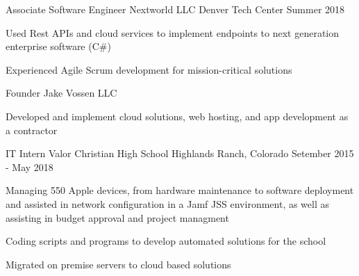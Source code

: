 

\begin{cventries}

  \cventry
    {Associate Software Engineer} %
    {Nextworld LLC} %
    {Denver Tech Center} %
    {Summer 2018} %
    {
      \begin{cvitems} %
        \item {Used Rest APIs and cloud services to implement
            endpoints to next generation enterprise software (C\#)}
        \item {Experienced Agile Scrum development for mission-critical solutions}
      \end{cvitems}
    }

  \cventry
    {Founder}
    {Jake Vossen LLC} %
    {} %
    { }
    {
      \begin{cvitems} %
        \item {Developed and implement cloud solutions, web hosting,
            and app development as a contractor}
      \end{cvitems}
    }

  \cventry
    {IT Intern}
    {Valor Christian High School }
    {Highlands Ranch, Colorado} %
    {Setember 2015 - May 2018} %
    {
      \begin{cvitems} %
        \item {Managing 550 Apple devices, from hardware maintenance
            to software deployment and assisted in network
            configuration in a Jamf JSS environment, as well as
            assisting in budget approval and project managment}
        \item {Coding scripts and programs to develop automated
            solutions for the school}
        \item {Migrated on premise servers to cloud based solutions}
      \end{cvitems}
    }
\end{cventries}
